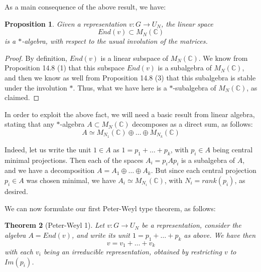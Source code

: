 \documentclass[12pt]{amsbook}
\newtheorem{theorem}{Theorem}[chapter]
\newtheorem{proposition}[theorem]{Proposition}
\begin{document}
As a main consequence of the above result, we have:

\begin{proposition}
Given a representation $v:G\to U_N$, the linear space
$$End(v)\subset M_N(\mathbb C)$$
is a $*$-algebra, with respect to the usual involution of the matrices.
\end{proposition}

\begin{proof}
By definition, $End(v)$ is a linear subspace of $M_N(\mathbb C)$. We know from Proposition 14.8 (1) that this subspace $End(v)$ is a subalgebra of $M_N(\mathbb C)$, and then we know as well from Proposition 14.8 (3) that this subalgebra is stable under the involution $*$. Thus, what we have here is a $*$-subalgebra of $M_N(\mathbb C)$, as claimed.
\end{proof}

In order to exploit the above fact, we will need a basic result from linear algebra, stating that any $*$-algebra $A\subset M_N(\mathbb C)$ decomposes as a direct sum, as follows:
$$A\simeq M_{N_1}(\mathbb C)\oplus\ldots\oplus M_{N_k}(\mathbb C)$$

Indeed, let us write the unit $1\in A$ as $1=p_1+\ldots+p_k$, with $p_i\in A$ being central minimal projections. Then each of the spaces $A_i=p_iAp_i$ is a subalgebra of $A$, and we have a decomposition $A=A_1\oplus\ldots\oplus A_k$. But since each central projection $p_i\in A$ was chosen minimal, we have $A_i\simeq M_{N_i}(\mathbb C)$, with $N_i=rank(p_i)$, as desired.

\bigskip

We can now formulate our first Peter-Weyl type theorem, as follows:


\begin{theorem}[Peter-Weyl 1]
Let $v:G\to U_N$ be a representation, consider the algebra $A=End(v)$, and write its unit $1=p_1+\ldots+p_k$ as above. We have then 
$$v=v_1+\ldots+v_k$$
with each $v_i$ being an irreducible representation, obtained by restricting $v$ to $Im(p_i)$.
\end{theorem}
\end{document}
